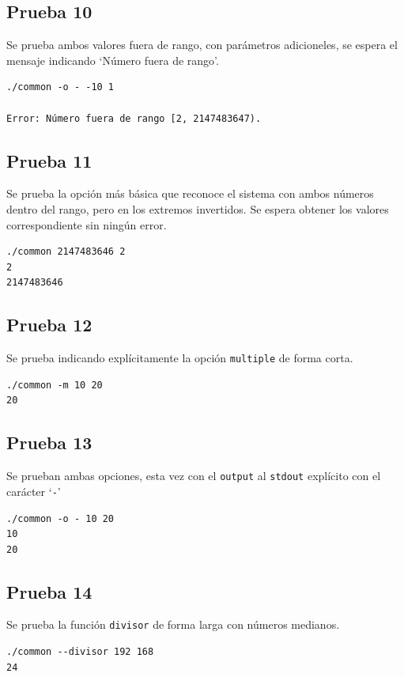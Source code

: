 \documentclass[titlepage,a4paper]{article}
\begin{document}
\subsection{Prueba 10}
Se prueba ambos valores fuera de rango, con parámetros adicioneles, se espera el mensaje indicando `Número fuera de rango'.
\begin{lstlisting}[style=test_run_style]
./common -o - -10 1

Error: Número fuera de rango [2, 2147483647).

\end{lstlisting}

\subsection{Prueba 11}

Se prueba la opción más básica que reconoce el sistema con ambos números dentro del rango, pero en los extremos invertidos. Se espera obtener los valores correspondiente sin ningún error. 
\begin{lstlisting}[style=test_run_style]
./common 2147483646 2
2
2147483646
\end{lstlisting}


\subsection{Prueba 12}


Se prueba indicando explícitamente la opción \verb|multiple| de forma corta.
\begin{lstlisting}[style=test_run_style]
./common -m 10 20
20
\end{lstlisting}

\subsection{Prueba 13}

Se prueban ambas opciones, esta vez con el \verb|output| al \verb|stdout| explícito con el carácter `\verb|-|'
\begin{lstlisting}[style=test_run_style]
./common -o - 10 20
10
20
\end{lstlisting}

\subsection{Prueba 14}
Se prueba la función \verb|divisor| de forma larga con números medianos.
\begin{lstlisting}[style=test_run_style]
./common --divisor 192 168
24
\end{lstlisting}
\end{document}
